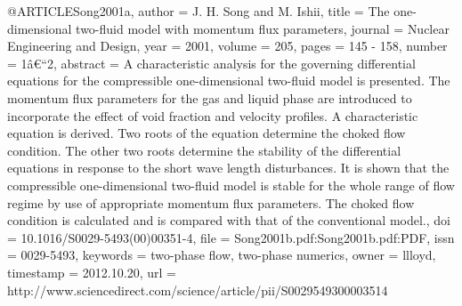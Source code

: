 {{@ARTICLE{Song2001a,
  author = {J. H. Song and M. Ishii},
  title = {The one-dimensional two-fluid model with momentum flux parameters},
  journal = {Nuclear Engineering and Design},
  year = {2001},
  volume = {205},
  pages = {145 - 158},
  number = {1â€“2},
  abstract = {A characteristic analysis for the governing differential equations
	for the compressible one-dimensional two-fluid model is presented.
	The momentum flux parameters for the gas and liquid phase are introduced
	to incorporate the effect of void fraction and velocity profiles.
	A characteristic equation is derived. Two roots of the equation determine
	the choked flow condition. The other two roots determine the stability
	of the differential equations in response to the short wave length
	disturbances. It is shown that the compressible one-dimensional two-fluid
	model is stable for the whole range of flow regime by use of appropriate
	momentum flux parameters. The choked flow condition is calculated
	and is compared with that of the conventional model.},
  doi = {10.1016/S0029-5493(00)00351-4},
  file = {Song2001b.pdf:Song2001b.pdf:PDF},
  issn = {0029-5493},
  keywords = {two-phase flow, two-phase numerics},
  owner = {llloyd},
  timestamp = {2012.10.20},
  url = {http://www.sciencedirect.com/science/article/pii/S0029549300003514}
}

}}
